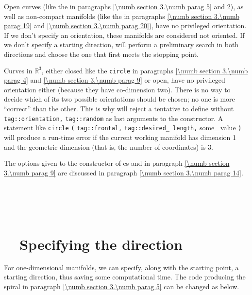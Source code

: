 Open curves (like the {\small\tt{}} in paragraphs \ref{\numb section 3.\numb parag 5} and
\ref{\numb section 3.\numb parag 12}), as well as non-compact manifolds
(like the {\small\tt{}} in paragraphs \ref{\numb section 3.\numb parag 19} and
\ref{\numb section 3.\numb parag 20}), have no privileged orientation.
If we don't specify an orientation, these manifolds are considered not oriented.
If we don't specify a starting direction, {\maniFEM} will perform a preliminary search
in both directions and choose the one that first meets the stopping point.

Curves in $ \mathbb{R}^3 $, either closed like the {\small\tt circle} in paragraphs
\ref{\numb section 3.\numb parag 4} and \ref{\numb section 3.\numb parag 9} or open,
have no privileged orientation either (because they have co-dimension two).
There is no way to decide which of its two possible orientations
should be chosen; no one is more ``correct'' than the other.
This is why {\maniFEM} will reject a tentative to define {\small\tt{}} without
{\small\tt\textcolor{tag}{tag}::orientation,} {\small\tt\textcolor{tag}{tag}::random}
as last arguments to the {\small\tt{}} constructor.
A statement like {\small\tt{}} {\small\tt circle} {\small\tt (}
{\small\tt\textcolor{tag}{tag}::frontal,} {\small\tt\textcolor{tag}{tag}::desired\_\,length,}
some\_\,value {\small\tt)}
will produce a run-time error if the current working manifold has dimension 1 and
the geometric dimension (that is, the number of coordinates) is 3.

The options given to the constructor of {\small\tt{}}es {\small\tt{}} and
{\small\tt{}} in paragraph \ref{\numb section 3.\numb parag 9} are discussed in paragraph
\ref{\numb section 3.\numb parag 14}.


\section{~~\cinzasec{[empty]}}\label{\numb section 3.\numb parag 11}


\section{~~Specifying the direction}\label{\numb section 3.\numb parag 12}

For one-dimensional manifolds, we can specify, along with the starting point,
a starting direction, thus saving some computational time.
The code producing the spiral in paragraph \ref{\numb section 3.\numb parag 5}
can be changed as below.

